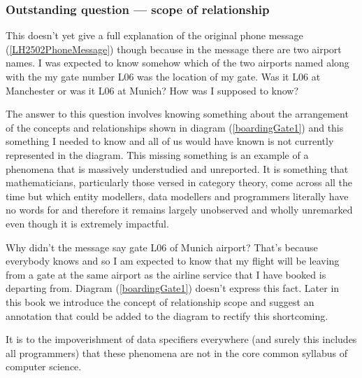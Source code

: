 \subsubsection{Outstanding question --- scope of relationship}
This doesn't yet give a full explanation of the original phone message 
(\ref{LH2502PhoneMessage}) though because
in the message there are two airport names. 
I was expected to know somehow which of the two airports named along with the my gate number L06
was the location of my gate.  Was it L06 at Manchester or was it L06 at Munich? How was I supposed to know? 

\mynote The answer to this question involves knowing something about the arrangement
of the concepts and relationships shown in diagram (\ref{boardingGate1}) 
and this something I needed to know and all of us would have known is not
currently represented in the diagram.  This missing something is an example of a phenomena  
that is massively understudied and unreported. It is something that mathematicians, particularly those versed in category theory, come across all the time but which entity modellers, data modellers and programmers literally have no words for and therefore it remains largely unobserved and wholly unremarked even though it is extremely impactful.

\mynote 
Why didn't the message say gate L06 of Munich airport?
That's because everybody knows and so I am expected to know that my flight will be leaving from a gate at the same airport as the airline service that I have booked is departing from. 
Diagram (\ref{boardingGate1}) doesn't express this fact. 
Later in this book we introduce the concept of relationship scope and 
suggest an annotation that could be added to the diagram to rectify this shortcoming.

It is to the impoverishment of data specifiers everywhere (and surely this includes all programmers) that these phenomena are not in the core common syllabus of computer science.  
